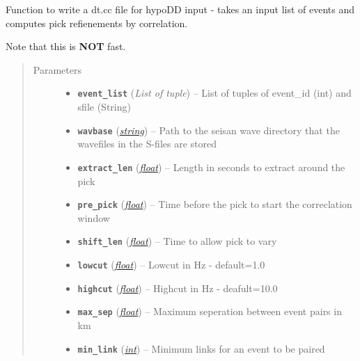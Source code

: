 \documentclass[a4paper,10pt,english]{sphinxmanual}
\begin{document}
\begin{fulllineitems}
\label{submodules/utils.catalogue2DD:catalogue2DD.write_correlations}
Function to write a dt.cc file for hypoDD input - takes an input list of
events and computes pick refienements by correlation.

Note that this is \textbf{NOT} fast.
\begin{quote}\begin{description}
\item[{Parameters}] \leavevmode\begin{itemize}
\item {} 
\textbf{\texttt{event\_list}} (\emph{List of tuple}) -- List of tuples of event\_id (int) and sfile (String)

\item {} 
\textbf{\texttt{wavbase}} (\href{https://docs.python.org/library/string.html\#module-string}{\emph{string}}) -- Path to the seisan wave directory that the wavefiles in the
S-files are stored

\item {} 
\textbf{\texttt{extract\_len}} (\href{https://docs.python.org/library/functions.html\#float}{\emph{float}}) -- Length in seconds to extract around the pick

\item {} 
\textbf{\texttt{pre\_pick}} (\href{https://docs.python.org/library/functions.html\#float}{\emph{float}}) -- Time before the pick to start the correclation window

\item {} 
\textbf{\texttt{shift\_len}} (\href{https://docs.python.org/library/functions.html\#float}{\emph{float}}) -- Time to allow pick to vary

\item {} 
\textbf{\texttt{lowcut}} (\href{https://docs.python.org/library/functions.html\#float}{\emph{float}}) -- Lowcut in Hz - default=1.0

\item {} 
\textbf{\texttt{highcut}} (\href{https://docs.python.org/library/functions.html\#float}{\emph{float}}) -- Highcut in Hz - deafult=10.0

\item {} 
\textbf{\texttt{max\_sep}} (\href{https://docs.python.org/library/functions.html\#float}{\emph{float}}) -- Maximum seperation between event pairs in km

\item {} 
\textbf{\texttt{min\_link}} (\href{https://docs.python.org/library/functions.html\#int}{\emph{int}}) -- Minimum links for an event to be paired

\end{itemize}

\end{description}\end{quote}

\end{fulllineitems}
\end{document}
